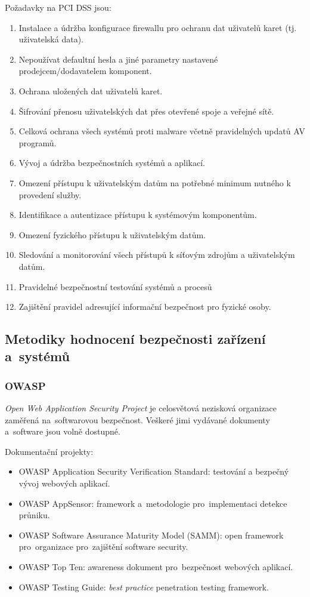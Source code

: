 Požadavky na PCI DSS jsou:
\vspace*{-0.5em}\begin{enumerate}
\item Instalace a údržba konfigurace firewallu pro ochranu dat uživatelů karet (tj. uživatelská data).
\item Nepoužívat defaultní hesla a jiné parametry nastavené prodejcem/dodavatelem komponent.
\item Ochrana uložených dat uživatelů karet.
\item Šifrování přenosu uživatelských dat přes otevřené spoje a veřejné sítě.
\item Celková ochrana všech systémů proti malware včetně pravidelných updatů AV programů.
\item Vývoj a údržba bezpečnostních systémů a aplikací.
\item Omezení přístupu k uživatelským datům na potřebné minimum nutného k provedení služby.
\item Identifikace a autentizace přístupu k systémovým komponentům.
\item Omezení fyzického přístupu k uživatelským datům.
\item Sledování a monitorování všech přístupů k síťovým zdrojům a uživatelským datům.
\item Pravidelné bezpečnostní testování systémů a procesů
\item Zajištění pravidel adresující informační bezpečnost pro fyzické osoby.
\end{enumerate}


\subsection{Metodiky hodnocení bezpečnosti zařízení a~systémů}

\subsubsection{OWASP}

\emph{Open Web Application Security Project} je celosvětová nezisková organizace zaměřená na~softwarovou bezpečnost.
Veškeré jimi vydávané dokumenty a~software jsou volně dostupné.

Dokumentační projekty:
\vspace*{-0.5em}\begin{itemize}
    \item OWASP Application Security Verification Standard: testování a bezpečný vývoj webových aplikací.
    \item OWASP AppSensor: framework a~metodologie pro~implementaci detekce průniku.
    \item OWASP Software Assurance Maturity Model (SAMM): open framework pro~organizace pro~zajištění software security.
    \item OWASP Top Ten: awareness dokument pro~bezpečnost webových aplikací.
    \item OWASP Testing Guide: \emph{best practice} penetration testing framework.
\end{itemize}


